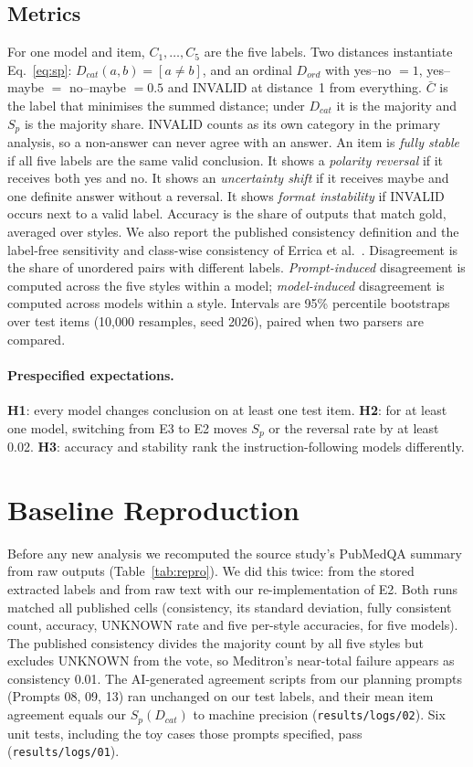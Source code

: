 \documentclass[acmsmall]{acmart}
\begin{document}
\subsection{Metrics}\label{sec:metrics}
For one model and item, $C_1,\ldots,C_5$ are the five labels. Two distances instantiate Eq.~\ref{eq:sp}: $D_{cat}(a,b)=[a\neq b]$, and an ordinal $D_{ord}$ with yes--no $=1$, yes--maybe $=$ no--maybe $=0.5$ and INVALID at distance~1 from everything. $\bar C$ is the label that minimises the summed distance; under $D_{cat}$ it is the majority and $S_p$ is the majority share. INVALID counts as its own category in the primary analysis, so a non-answer can never agree with an answer. An item is \emph{fully stable} if all five labels are the same valid conclusion. It shows a \emph{polarity reversal} if it receives both yes and no. It shows an \emph{uncertainty shift} if it receives maybe and one definite answer without a reversal. It shows \emph{format instability} if INVALID occurs next to a valid label. Accuracy is the share of outputs that match gold, averaged over styles. We also report the published consistency definition and the label-free sensitivity and class-wise consistency of Errica et al.\ \cite{errica2025sensitivity}. Disagreement is the share of unordered pairs with different labels. \emph{Prompt-induced} disagreement is computed across the five styles within a model; \emph{model-induced} disagreement is computed across models within a style. Intervals are 95\% percentile bootstraps over test items (10,000 resamples, seed 2026), paired when two parsers are compared.

\paragraph{Prespecified expectations.} \textbf{H1}: every model changes conclusion on at least one test item. \textbf{H2}: for at least one model, switching from E3 to E2 moves $S_p$ or the reversal rate by at least 0.02. \textbf{H3}: accuracy and stability rank the instruction-following models differently.

\section{Baseline Reproduction}\label{sec:baseline}
Before any new analysis we recomputed the source study's PubMedQA summary from raw outputs (Table~\ref{tab:repro}). We did this twice: from the stored extracted labels and from raw text with our re-implementation of E2. Both runs matched all \ReproCells{} published cells (consistency, its standard deviation, fully consistent count, accuracy, UNKNOWN rate and five per-style accuracies, for five models). The published consistency divides the majority count by all five styles but excludes UNKNOWN from the vote, so Meditron's near-total failure appears as consistency 0.01. The AI-generated agreement scripts from our planning prompts (Prompts 08, 09, 13) ran unchanged on our test labels, and their mean item agreement equals our $S_p(D_{cat})$ to machine precision (\texttt{results/logs/02}). Six unit tests, including the toy cases those prompts specified, pass (\texttt{results/logs/01}).
\end{document}
